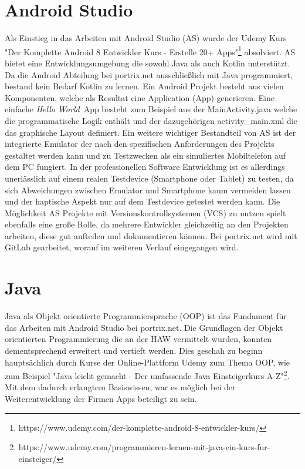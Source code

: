 \section{Android Studio}
Als Einstieg in das Arbeiten mit Android Studio (AS) wurde der Udemy Kurs "Der Komplette Android 8 Entwickler Kurs - Erstelle 20+ Apps"\footnote{https://www.udemy.com/der-komplette-android-8-entwickler-kurs/} absolviert.
AS bietet eine Entwicklungsumgebung die sowohl Java als auch Kotlin unterst\"utzt. Da die Android Abteilung bei portrix.net ausschlie\ss{}lich mit Java programmiert, bestand kein Bedarf Kotlin zu lernen.
Ein Android Projekt besteht aus vielen Komponenten, welche als Resultat eine Application (App) generieren. Eine einfache \textit{Hello World}~App besteht zum Beispiel aus der MainActivity.java welche die programmatische Logik enth\"alt und der dazugeh\"origen activity\_main.xml die das graphische Layout definiert.
Ein weitere wichtiger Bestandteil von AS ist der integrierte Emulator der nach den spezifischen Anforderungen des Projekts gestaltet werden kann und zu Testzwecken als ein simuliertes Mobiltelefon auf dem PC fungiert. In der professionellen Software Entwicklung ist es allerdings unerl\"asslich auf einem realen Testdevice (Smartphone oder Tablet) zu testen, da sich Abweichungen zwischen Emulator und Smartphone kaum vermeiden lassen und der haptische Aspekt nur auf dem Testdevice getestet werden kann.
Die M\"oglichkeit AS Projekte mit Versionskontrollsystemen (VCS) zu nutzen spielt ebenfalls eine gro\ss{}e Rolle, da mehrere Entwickler gleichzeitig an den Projekten arbeiten, diese gut aufteilen und dokumentieren k\"onnen. Bei portrix.net wird mit GitLab gearbeitet, worauf im weiteren Verlauf eingegangen wird.

\section{Java}
Java als Objekt orientierte Programmiersprache (OOP) ist das Fundament f\"ur das Arbeiten mit Android Studio bei portrix.net. Die Grundlagen der Objekt orientierten Programmierung die an der HAW vermittelt wurden, konnten dementsprechend erweitert und vertieft werden. Dies geschah zu beginn haupts\"achlich durch Kurse der Online-Plattform Udemy zum Thema OOP, wie zum Beispiel "Java leicht gemacht - Der umfassende Java Einsteigerkurs A-Z"\footnote{https://www.udemy.com/programmieren-lernen-mit-java-ein-kurs-fur-einsteiger/}.  
Mit dem dadurch erlangtem Basiswissen, war es m\"oglich bei der Weiterentwicklung der Firmen Apps beteiligt zu sein.

